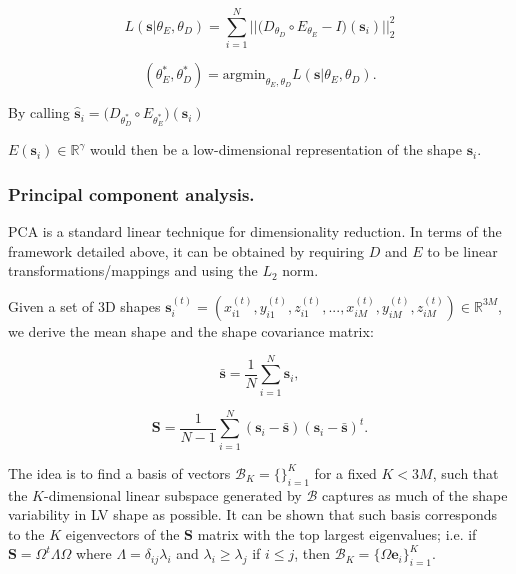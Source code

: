 \documentclass[twocolumn]{llncs}
\begin{document}
\begin{equation}
L(\textbf{s}|\theta_E, \theta_D)=
\sum_{i=1}^{N} \big|\big|\big(D_{\theta_D} \circ E_{\theta_E} - I\big) (\textbf{s}_i) \big|\big|_2^2
\end{equation}{}


\begin{equation}
(\theta_E^*, \theta_D^*) = \text{argmin}_{\theta_E, \theta_D}L(\textbf{s}|\theta_E, \theta_D).    
\end{equation}{}


By calling $\hat{\textbf{s}}_i=\big(D_{\theta_D^*} \circ E_{\theta_E^*}\big)(\textbf{s}_i)$

$E(\textbf{s}_i)\in\mathbb{R}^{\gamma}$ would then be a low-dimensional representation of the shape $\textbf{s}_i$.

\subsubsection{Principal component analysis.}
PCA is a standard linear technique for dimensionality reduction. In terms of the framework detailed above, it can be obtained by requiring $D$ and $E$ to be linear transformations/mappings and using the $L_2$ norm.

Given a set of 3D shapes $\textbf{s}_i^{(t)}=(x_{i1}^{(t)}, y_{i1}^{(t)}, z_{i1}^{(t)}, ..., x_{iM}^{(t)}, y_{iM}^{(t)}, z_{iM}^{(t)})\in \mathbb{R}^{3M}$, we derive the mean shape and the shape covariance matrix:

\begin{equation}
\bar{\textbf{s}}=\frac{1}{N}\sum_{i=1}^{N}{\textbf{s}}_i,
\end{equation}

\begin{equation}
\textbf{S}=\frac{1}{N-1}\sum_{i=1}^{N}({\textbf{s}}_i-\bar{\textbf{s}})({\textbf{s}}_i-\bar{\textbf{s}})^t.
\end{equation}

The idea is to find a basis of vectors $\mathcal{B}_{K}=\{\}_{i=1}^{K}$ for a fixed $K < 3M$, such that the $K$-dimensional linear subspace generated by $\mathcal{B}$ captures as much of the shape variability in LV shape as possible. It can be shown that such basis corresponds to the $K$ eigenvectors of the $\textbf{S}$ matrix with the top largest eigenvalues; i.e. if $\textbf{S}=\Omega^{t}\Lambda\Omega$ where $\Lambda=\delta_{ij}\lambda_i$ and $\lambda_i \geq \lambda_j$ if $i\leq j$, then $\mathcal{B}_{K}=\{{\Omega\textbf{e}_i}\}_{i=1}^{K}$.
\end{document}
